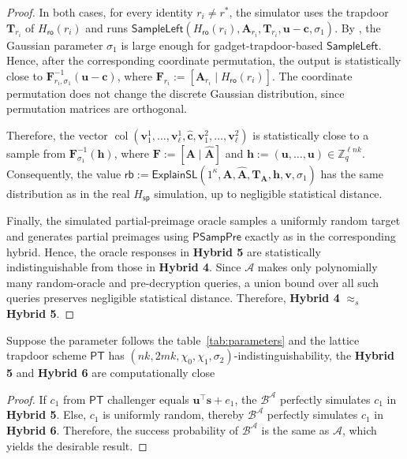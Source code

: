 \begin{proof}
In both cases, for every identity $r_i\neq r^\ast$, the simulator uses the
trapdoor $\mathbf T_{r_i}$ of $H_{\mathsf{ro}}(r_i)$ and runs
$\mathsf{SampleLeft}
(H_{\mathsf{ro}}(r_i),\mathbf A_{r_i},\mathbf T_{r_i},
\mathbf u-\mathbf c,\sigma_1)$.
By , the Gaussian parameter $\sigma_1$ is large
enough for gadget-trapdoor-based $\mathsf{SampleLeft}$. Hence, after the
corresponding coordinate permutation, the output is statistically close to
$\mathbf F_{r_i,\sigma_1}^{-1}(\mathbf u-\mathbf c)$, where
$\mathbf F_{r_i}:=[\mathbf A_{r_i}\mid H_{\mathsf{ro}}(r_i)]$.
The coordinate permutation does not change the discrete Gaussian distribution,
since permutation matrices are orthogonal.

Therefore, the vector
$\operatorname{col}
(\mathbf v_1^1,\ldots,\mathbf v_\ell^1,
\widehat{\mathbf c},
\mathbf v_1^2,\ldots,\mathbf v_\ell^2)$
is statistically close to a sample from
$\mathbf F_{\sigma_1}^{-1}(\mathbf h)$, where
$\mathbf F:=[\mathbf A\mid\widehat{\mathbf A}]$ and
$\mathbf h:=(\mathbf u,\ldots,\mathbf u)\in\mathbb Z_q^{\ell nk}$.
Consequently, the value
$\mathsf{rb}:=
\mathsf{ExplainSL}
(1^\kappa,\mathbf A,\widehat{\mathbf A},
\mathbf T_{\mathbf A},\mathbf h,\mathbf v,\sigma_1)$
has the same distribution as in the real $H_{\mathsf{sp}}$ simulation, up to
negligible statistical distance.

Finally, the simulated partial-preimage oracle samples a uniformly random
target and generates partial preimages using $\mathsf{PSampPre}$ exactly as
in the corresponding hybrid. Hence, the oracle responses in \textbf{Hybrid 5}
are statistically indistinguishable from those in \textbf{Hybrid 4}. Since
$\mathcal A$ makes only polynomially many random-oracle and pre-decryption
queries, a union bound over all such queries preserves negligible statistical
distance. Therefore, \textbf{Hybrid 4} $\approx_s$ \textbf{Hybrid 5}.
\end{proof}

\noindent\begin{lemma}
    Suppose the parameter follows the table~\ref{tab:parameters} and the lattice trapdoor scheme $\mathsf{PT}$ has $(nk,2mk,\chi_0,\chi_1, \sigma_2)$-indistinguishability, the \textbf{Hybrid 5} and \textbf{Hybrid 6} are computationally close
\end{lemma}
\begin{proof}
    If $c_1$ from $\mathsf{PT}$ challenger equals $\mathbf{u^\top s} + e_1$, the $\mathcal{B}^\mathcal{A}$ perfectly simulates $c_1$ in \textbf{Hybrid 5}. Else, $c_1$ is uniformly random, thereby $\mathcal{B}^\mathcal{A}$ perfectly simulates $c_1$ in \textbf{Hybrid 6}. Therefore, the success probability of $\mathcal{B}^\mathcal{A}$ is the same as $\mathcal{A}$, which yields the desirable result.
\end{proof}
